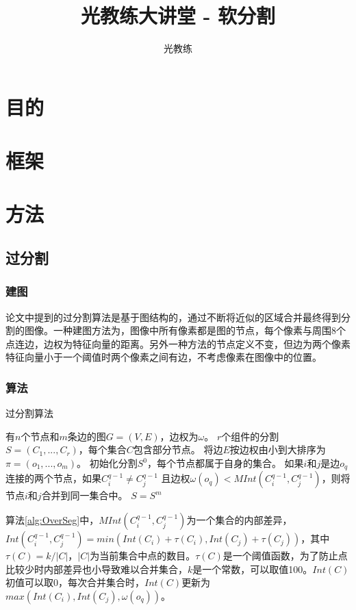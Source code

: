 \documentclass[11pt, a4paper]{article}
\begin{document}
\begin{CJK}{UTF8}{song}
\title{光教练大讲堂 - 软分割}
\author{光教练}
\maketitle
\section{目的}
\section{框架}
\section{方法}
\subsection{过分割}
\subsubsection{建图}
论文\cite{Bib_Segment}中提到的过分割算法是基于图结构的，通过不断将近似的区域合并最终得到分割的图像。一种建图方法为，图像中所有像素都是图的节点，每个像素与周围8个点连边，边权为特征向量的距离。另外一种方法的节点定义不变，但边为两个像素特征向量小于一个阈值时两个像素之间有边，不考虑像素在图像中的位置。
\subsubsection{算法}
\begin{algorithm}
\caption{过分割算法}
\label{alg:OverSeg}
\begin{algorithmic}[1]
\REQUIRE
有$n$个节点和$m$条边的图$G=(V, E)$，边权为$\omega$。
\ENSURE
$r$个组件的分割$S=(C_1,...,C_r)$，每个集合$C$包含部分节点。
\STATE 将边$E$按边权由小到大排序为$\pi=(o_1, ..., o_m)$。
\STATE 初始化分割$S^0$，每个节点都属于自身的集合。
\STATE 如果$i$和$j$是边$o_q$连接的两个节点，如果$C_{i}^{q-1} \neq C_{j}^{q-1}$ 且边权$\omega(o_q)<MInt(C_i^{q-1}, C_j^{q-1})$，则将节点$i$和$j$合并到同一集合中。
\ENDFOR
\RETURN $S=S^m$
\end{algorithmic}
\end{algorithm}
算法\ref{alg:OverSeg}中，$MInt(C_i^{q-1}, C_j^{q-1})$为一个集合的内部差异，$Int(C_i^{q-1}, C_j^{q-1})=min(Int(C_i)+\tau(C_i), Int(C_j)+\tau(C_j))$，其中$\tau(C)=k/|C|$，$|C|$为当前集合中点的数目。$\tau(C)$是一个阈值函数，为了防止点比较少时内部差异也小导致难以合并集合，$k$是一个常数，可以取值100。$Int(C)$初值可以取0，每次合并集合时，$Int(C)$更新为$max(Int(C_i), Int(C_j), \omega(o_q))$。

\end{CJK}
\end{document}
